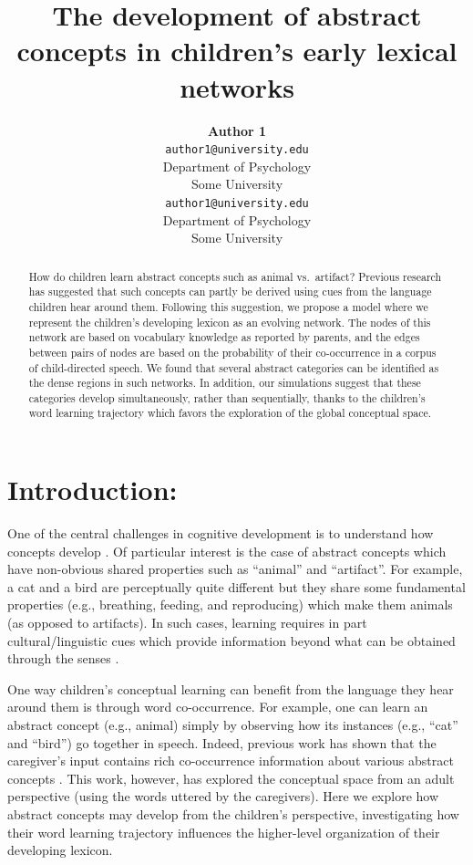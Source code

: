 \documentclass[11pt]{article}
\title{The development of abstract concepts in children's early lexical
networks}
\author{{\large \bf Author 1} \\ \texttt{author1@university.edu} \\ Department of Psychology \\ Some University \And {\large \bf Author 2} \\ \texttt{author1@university.edu} \\ Department of Psychology \\ Some University}
\date{}
\begin{document}
\maketitle

\begin{abstract}
How do children learn abstract concepts such as animal vs.~artifact?
Previous research has suggested that such concepts can partly be derived
using cues from the language children hear around them. Following this
suggestion, we propose a model where we represent the children's
developing lexicon as an evolving network. The nodes of this network are
based on vocabulary knowledge as reported by parents, and the edges
between pairs of nodes are based on the probability of their
co-occurrence in a corpus of child-directed speech. We found that
several abstract categories can be identified as the dense regions in
such networks. In addition, our simulations suggest that these
categories develop simultaneously, rather than sequentially, thanks to
the children's word learning trajectory which favors the exploration of
the global conceptual space.
\end{abstract}

\section{Introduction:}\label{introduction}

One of the central challenges in cognitive development is to understand
how concepts develop \cite{carey2009,keil1992,gopnik1997}. Of particular
interest is the case of abstract concepts which have non-obvious shared
properties such as ``animal'' and ``artifact''. For example, a cat and a
bird are perceptually quite different but they share some fundamental
properties (e.g., breathing, feeding, and reproducing) which make them
animals (as opposed to artifacts). In such cases, learning requires in
part cultural/linguistic cues which provide information beyond what can
be obtained through the senses \cite{gelman2009,harris2012,csibra2009}.

One way children's conceptual learning can benefit from the language
they hear around them is through word co-occurrence. For example, one
can learn an abstract concept (e.g., animal) simply by observing how its
instances (e.g., ``cat'' and ``bird'') go together in speech. Indeed,
previous work has shown that the caregiver's input contains rich
co-occurrence information about various abstract concepts
\cite{huebner2018}. This work, however, has explored the conceptual
space from an adult perspective (using the words uttered by the
caregivers). Here we explore how abstract concepts may develop from the
children's perspective, investigating how their word learning trajectory
influences the higher-level organization of their developing lexicon.
\end{document}
